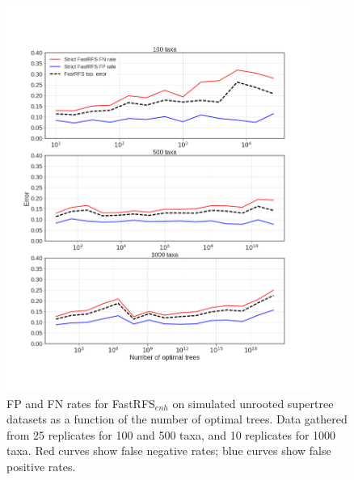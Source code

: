 \begin{figure}
  \centering
  \includegraphics[width=0.9\textwidth]{siesta-supp-figs/fastrfs_ntrees_vs_err}
  \caption[FP and FN rates for FastRFS$_{enh}$ on  simulated unrooted
    supertree datasets as a function of the number of optimal
    trees]{FP and FN rates for FastRFS$_{enh}$ on  simulated unrooted
    supertree datasets as a function of the number of optimal
    trees. Data gathered from 25 replicates for 100 and 500 taxa, and
    10 replicates for 1000 taxa. Red curves show false negative rates;
    blue curves show false positive rates.}
  \label{fig:supertree-consensus-comparison-2}
\end{figure}






